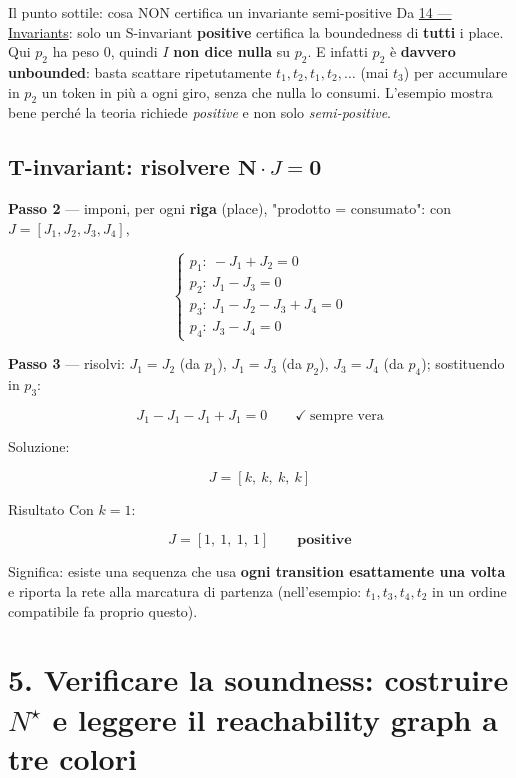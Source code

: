 \begin{boxwarning}{Il punto sottile: cosa NON certifica un invariante semi-positive}
Da \hyperref[ch:14]{14 — Invariants}: solo un S-invariant \textbf{positive} certifica la boundedness di \textbf{tutti} i place. Qui $p_2$ ha peso $0$, quindi $I$ \textbf{non dice nulla} su $p_2$. E infatti $p_2$ è \textbf{davvero unbounded}: basta scattare ripetutamente $t_1,t_2,t_1,t_2,\dots$ (mai $t_3$) per accumulare in $p_2$ un token in più a ogni giro, senza che nulla lo consumi. L'esempio mostra bene perché la teoria richiede \emph{positive} e non solo \emph{semi-positive}.
\end{boxwarning}

\subsection{\texorpdfstring{T-invariant: risolvere $\mathbf{N}\cdot J=\mathbf{0}$}{T-invariant: risolvere N J=0}}

\textbf{Passo 2} — imponi, per ogni \textbf{riga} (place), "prodotto = consumato": con $J=[J_1,J_2,J_3,J_4]$,

\[
\begin{cases}
p_1:\ -J_1+J_2=0\\
p_2:\ J_1-J_3=0\\
p_3:\ J_1-J_2-J_3+J_4=0\\
p_4:\ J_3-J_4=0
\end{cases}
\]

\textbf{Passo 3} — risolvi: $J_1=J_2$ (da $p_1$), $J_1=J_3$ (da $p_2$), $J_3=J_4$ (da $p_4$); sostituendo in $p_3$:

\[
J_1-J_1-J_1+J_1=0 \qquad\checkmark\ \text{sempre vera}
\]

Soluzione:

\[
J = [k,\ k,\ k,\ k]
\]

\begin{boxexample}{Risultato}
Con $k=1$:

\[
J = [1,\ 1,\ 1,\ 1] \qquad \textbf{positive}
\]

Significa: esiste una sequenza che usa \textbf{ogni transition esattamente una volta} e riporta la rete alla marcatura di partenza (nell'esempio: $t_1,t_3,t_4,t_2$ in un ordine compatibile fa proprio questo).
\end{boxexample}

\section{\texorpdfstring{5. Verificare la soundness: costruire $N^\star$ e leggere il reachability graph a tre colori}{5. Verificare la soundness: costruire N\textasciicircum{} e leggere il reachability graph a tre colori}}

